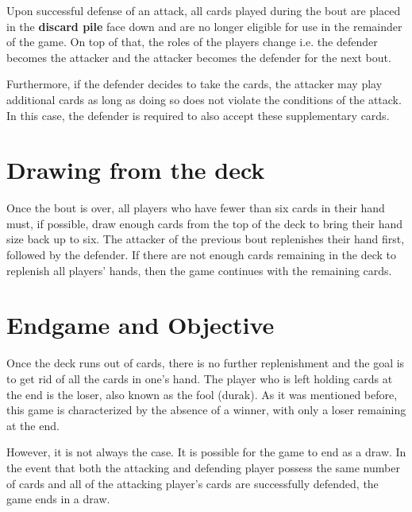 Upon successful defense of an attack, all cards played during the bout are placed in the \textbf{discard pile} face down and are no longer eligible for use in the remainder of the game. On top of that, the roles of the players change i.e. the defender becomes the attacker and the attacker becomes the defender for the next bout.

Furthermore, if the defender decides to take the cards, the attacker may play additional cards as long as doing so does not violate the conditions of the attack. In this case, the defender is required to also accept these supplementary cards.

\section{Drawing from the deck}
Once the bout is over, all players who have fewer than six cards in their hand must, if possible, draw enough cards from the top of the deck to bring their hand size back up to six. The attacker of the previous bout replenishes their hand first, followed by the defender. If there are not enough cards remaining in the deck to replenish all players' hands, then the game continues with the remaining cards.

\section{Endgame and Objective}
Once the deck runs out of cards, there is no further replenishment and the goal is to get rid of all the cards in one's hand. The player who is left holding cards at the end is the loser, also known as the fool (durak). As it was mentioned before, this game is characterized by the absence of a winner, with only a loser remaining at the end. 

However, it is not always the case. It is possible for the game to end as a draw. In the event that both the attacking and defending player possess the same number of cards and all of the attacking player's cards are successfully defended, the game ends in a draw.

